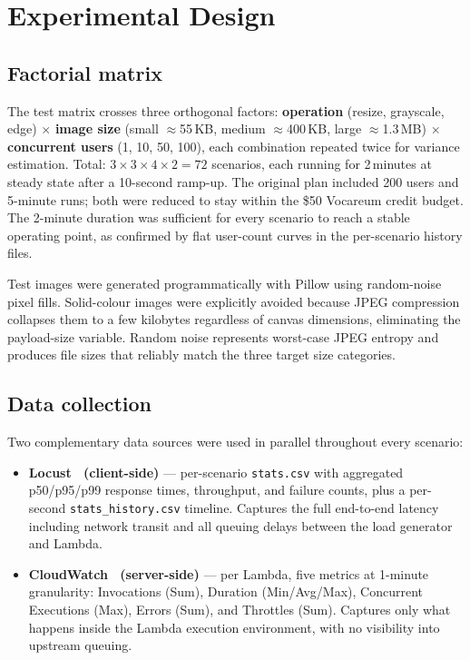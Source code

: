 \documentclass[10pt,twocolumn]{article}
\begin{document}
\section{Experimental Design}
\label{sec:design}

\subsection{Factorial matrix}

The test matrix crosses three orthogonal factors:
\textbf{operation} (resize, grayscale, edge) $\times$
\textbf{image size} (small $\approx$55\,KB, medium $\approx$400\,KB,
large $\approx$1.3\,MB) $\times$
\textbf{concurrent users} (1, 10, 50, 100),
each combination repeated twice for variance estimation.
Total: $3 \times 3 \times 4 \times 2 = 72$ scenarios, each running for
2\,minutes at steady state after a 10-second ramp-up. The original plan included
200 users and 5-minute runs; both were reduced to stay within the \$50 Vocareum
credit budget. The 2-minute duration was sufficient for every scenario to reach
a stable operating point, as confirmed by flat user-count curves in the
per-scenario history files.

Test images were generated programmatically with Pillow using random-noise pixel
fills. Solid-colour images were explicitly avoided because JPEG compression
collapses them to a few kilobytes regardless of canvas dimensions, eliminating
the payload-size variable. Random noise represents worst-case JPEG entropy and
produces file sizes that reliably match the three target size categories.

\subsection{Data collection}

Two complementary data sources were used in parallel throughout every scenario:

\begin{itemize}
  \item \textbf{Locust~\cite{locust:docs} (client-side)} --- per-scenario
        \texttt{stats.csv} with aggregated p50/p95/p99 response times,
        throughput, and failure counts, plus a per-second
        \texttt{stats\_history.csv} timeline. Captures the full end-to-end
        latency including network transit and all queuing delays between the
        load generator and Lambda.
  \item \textbf{CloudWatch~\cite{aws:cloudwatch} (server-side)} --- per Lambda,
        five metrics at 1-minute granularity: Invocations (Sum), Duration
        (Min/Avg/Max), Concurrent Executions (Max), Errors (Sum), and Throttles
        (Sum). Captures only what happens inside the Lambda execution
        environment, with no visibility into upstream queuing.
\end{itemize}
\end{document}
